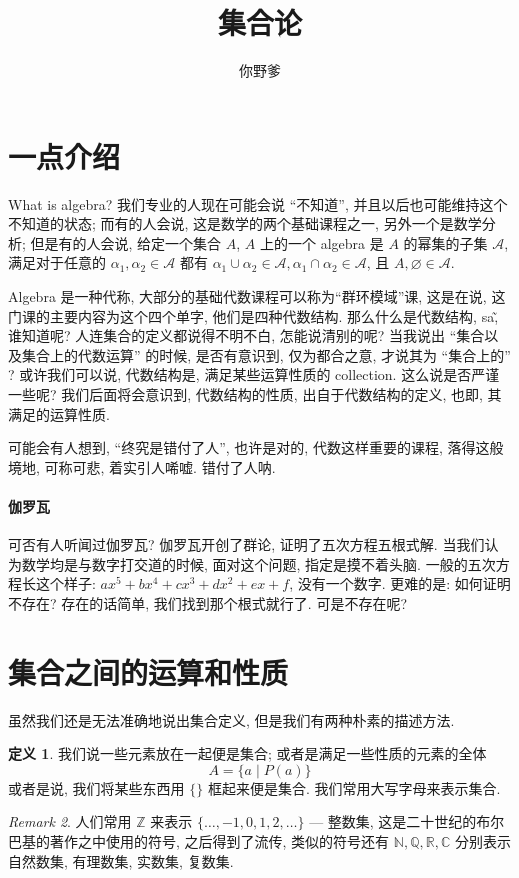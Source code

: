 \documentclass[10pt]{ctexart}
\theoremstyle{definition}
\theoremstyle{definition}
\newtheorem{definition}{定义}[section]
\theoremstyle{plain}
\theoremstyle{remark}
\newtheorem{remark}[definition]{Remark}
\begin{document}
\title{集合论}
\author{你野爹}
\maketitle
\tableofcontents
\newpage

\section{一点介绍}\label{sec:intro}
What is algebra? 我们专业的人现在可能会说 ``不知道'', 并且以后也可能维持这个不知道的状态; 而有的人会说, 这是数学的两个基础课程之一, 另外一个是数学分析; 但是有的人会说, 给定一个集合 \(A\), \(A\) 上的一个 algebra 是 \(A\) 的幂集的子集 \(\mathcal A\), 满足对于任意的 \(\alpha_{1}, \alpha_{2} \in \mathcal A\) 都有 \(\alpha_{1} \cup \alpha_{2} \in \mathcal A, \alpha_{1} \cap \alpha_{2} \in \mathcal A\), 且 \(A , \varnothing \in \mathcal A\). 

Algebra 是一种代称, 大部分的基础代数课程可以称为``群环模域''课, 这是在说, 这门课的主要内容为这个四个单字, 他们是四种代数结构. 那么什么是代数结构, sa\~ , 谁知道呢? 人连集合的定义都说得不明不白, 怎能说清别的呢? 当我说出 ``集合以及集合上的代数运算'' 的时候, 是否有意识到, 仅为都合之意, 才说其为 ``集合上的'' ? 或许我们可以说, 代数结构是, 满足某些运算性质的 collection. 这么说是否严谨一些呢? 我们后面将会意识到, 代数结构的性质, 出自于代数结构的定义, 也即, 其满足的运算性质. 

可能会有人想到, ``终究是错付了人'', 也许是对的, 代数这样重要的课程, 落得这般境地, 可称可悲, 着实引人唏嘘. 错付了人呐. 

\paragraph{伽罗瓦} 可否有人听闻过伽罗瓦? 伽罗瓦开创了群论, 证明了五次方程五根式解. 当我们认为数学均是与数字打交道的时候, 面对这个问题, 指定是摸不着头脑. 一般的五次方程长这个样子: \(a x^{5} + b x ^{4} + c x ^{3} + d x ^{2} + e x + f\), 没有一个数字. 更难的是: 如何证明不存在? 存在的话简单, 我们找到那个根式就行了. 可是不存在呢? 


\section{集合之间的运算和性质}\label{sec:set}
虽然我们还是无法准确地说出集合定义, 但是我们有两种朴素的描述方法. 
\begin{definition}
我们说一些元素放在一起便是集合; 或者是满足一些性质的元素的全体
\begin{equation}
A = \{ a \mid P (a) \} 
\end{equation}
或者是说, 我们将某些东西用 \(\{ \}\) 框起来便是集合.  我们常用大写字母来表示集合. 
\end{definition}
\begin{remark}
人们常用 \(\mathbb Z\) 来表示 \(\{\dots ,  -1 ,0 , 1 , 2 , \dots \} \) --- 整数集, 这是二十世纪的布尔巴基的著作之中使用的符号, 之后得到了流传, 类似的符号还有 \(\mathbb N, \mathbb Q , \mathbb R, \mathbb C\) 分别表示自然数集, 有理数集, 实数集, 复数集. 
\end{remark}
\end{document}
